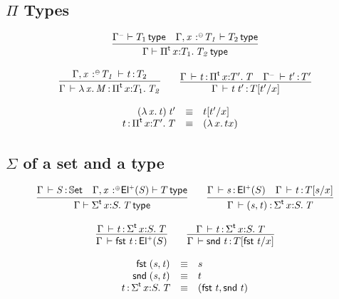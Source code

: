 \documentclass[11pt]{article}
\theoremstyle{plain}
\begin{document}
\subsection{$\Pi$ Types}

\[
\begin{array}{c}
\infer{\wftp{\Gamma}{\pitp{x}{T_1}{T_2}}}
      {\wftp{\Gamma^\con}{T_1} &
        \wftp{\Gamma, \vstptm {x}{\conc}{T_1}}{T_2}}
\\ \\
\infer{\oftp{\Gamma}{\ulam{x}{M}}{\pitp x {T_1} {T_2}}}
      {\oftp{\Gamma, \tptmv x {\conc} {T_1} }{t}{T_2}}
\qquad
\infer{\oftp{\Gamma}{\app t {t'}}{\subst T {t'} x}}
      {\oftp{\Gamma}{t}{\pitp{x}{T'}{T}} &
        \oftp{\Gamma^\con}{t'}{T'}}
\end{array}
\]

\[
\begin{array}{rcll}
\mathit{({\lambda\,x.\,t}) \: t'} & \equiv & t [ t' / x ] \\
t \, \mathit{:} \, \textnormal{$\Pi$}^{\mathsf{t}}\,x \mathit{:} T'.\,\mathit{T} & \equiv & {({\lambda\,x.\,t}{x})} &
\end{array} \\
\]


\subsection{$\Sigma$ of a set and a type}

\[
\begin{array}{c}
\infer{\wftp{\Gamma}{\sigmatp{x}{S}{T}}}
      {\oftp{\Gamma}{S}{\types} &
        \wftp{\Gamma, \tptmv{x}{\coc}{\Elp{S}}}{T}}
\qquad
\infer{\oftp{\Gamma}{\pair{s}{t}}{\sigmatp x S T}}
      {\oftp{\Gamma}{s}{\Elp{S}} &
       \oftp{\Gamma}{t}{\subst{T}{s}x}}
\\ \\
\infer{\oftp{\Gamma}{\fst t}{\Elp{S}}}
      {\oftp{\Gamma}{t}{\sigmatp{x}{S}{T}}}
\qquad
\infer{\oftp{\Gamma}{\snd t}{\subst{T}{\fst t}{x}}}
      {\oftp{\Gamma}{t}{\sigmatp{x}{S}{T}}}
\end{array}
\]

\[
\begin{array}{rcll}
\mathit{\mathsf{fst}_{} \: \mathit{(s,t)_{}}} & \equiv & s \\
\mathit{\mathsf{snd}_{} \: \mathit{(s,t)_{}}} & \equiv & t \\
t \, \mathit{:} \, \textnormal{$\Sigma$}^{\mathsf{t}}\,x \mathit{:} S.\,\mathit{T} & \equiv & \mathit{(\mathit{\mathsf{fst}_{} \: t},\mathit{\mathsf{snd}_{} \: t})_{}}
\end{array}
\]

\end{document}
